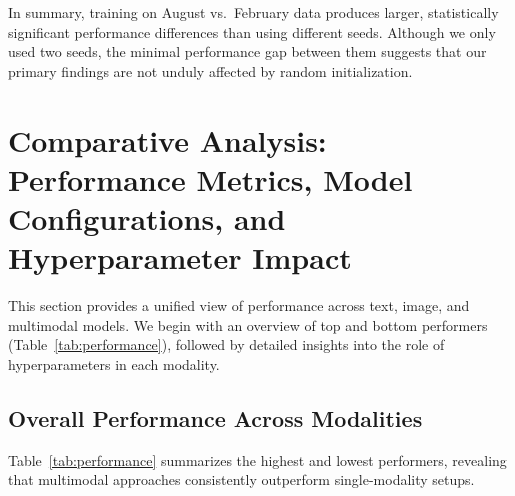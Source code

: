 \noindent
In summary, training on August vs.\ February data produces larger, statistically significant performance differences than using different seeds. Although we only used two seeds, the minimal performance gap between them suggests that our primary findings are not unduly affected by random initialization.


\section{Comparative Analysis: Performance Metrics, Model Configurations, and Hyperparameter Impact}

This section provides a unified view of performance across text, image, and multimodal models. We begin with an overview of top and bottom performers (Table~\ref{tab:performance}), followed by detailed insights into the role of hyperparameters in each modality. 


\subsection{Overall Performance Across Modalities}


Table~\ref{tab:performance} summarizes the highest and lowest performers, revealing that multimodal approaches consistently outperform single-modality setups. 

